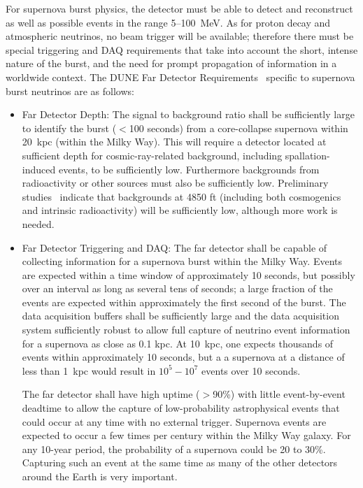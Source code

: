 For supernova burst physics, the detector must be able to detect and reconstruct as well as possible events in the range 5--100~MeV.  As for proton decay and atmospheric neutrinos, no beam trigger will be available; therefore there must be special triggering and DAQ requirements that take into account the short, intense nature of the burst, and the need for prompt propagation of information in a worldwide context.
The DUNE Far Detector
Requirements~\cite{lbnfdune-cdr-req} specific to supernova burst neutrinos are as follows:

\begin{itemize}

\item Far Detector Depth: The signal to background ratio shall be sufficiently large to identify the  burst ($<$100 seconds)  from a core-collapse supernova within 20~kpc (within the Milky Way). This will require a detector located at sufficient depth for cosmic-ray-related background, including spallation-induced events, to be sufficiently low.  Furthermore backgrounds from radioactivity or other sources must also be sufficiently low.  Preliminary studies~\cite{gehman} indicate that backgrounds at 4850 ft (including both cosmogenics and intrinsic radioactivity) will be sufficiently low, although more work is needed.

\item Far Detector Triggering and DAQ:  The far detector shall be capable of collecting information for a supernova burst within the Milky Way.  Events are expected within a time window of approximately 10 seconds, but possibly over an interval as long as several tens of seconds; a large fraction of the events are expected within approximately the first second of the burst.
The data acquisition buffers shall be sufficiently large and the data acquisition system sufficiently robust to allow full capture of neutrino event information for a supernova as close as 0.1 kpc.
At 10~kpc, one expects thousands of events within approximately 10 seconds, but a a supernova at a distance of less than 1~kpc would result in $10^5-10^7$  events over 10 seconds.    

The far detector shall have high uptime ($>$90\%) with little event-by-event deadtime to allow the capture of low-probability astrophysical events that could occur at any time with no external trigger. 
Supernova events are expected to occur a few times per century within the Milky Way galaxy. For any 10-year period, the probability of a supernova could be 20 to 30\%.  Capturing such an event at the same time as many of the other detectors around the Earth is very important.  


\end{itemize}
